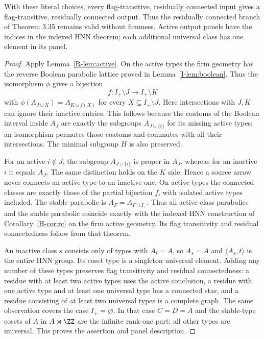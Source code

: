 \begin{theorem}\label{R-thm:rc}
With these literal choices, every flag-transitive, residually connected
input gives a flag-transitive, residually connected output. Thus the
residually connected branch of Theorem 3.35 remains valid without
firmness. Active output panels have the indices in the indexed HNN theorem; each additional universal class has one element
in its panel.
\end{theorem}
\begin{proof}
Apply Lemma~\ref{R-lem:active}. On the active types the firm geometry
has the reverse Boolean parabolic lattice proved in Lemma~\ref{I-lem:boolean}. Thus the isomorphism $\phi$ gives a
bijection
\[
 f:I_+\setminus J\longrightarrow I_+\setminus K
\]
with
$\phi(A_{J\cup X})=A_{K\cup f(X)}$ for every
$X\subseteq I_+\setminus J$. Here intersections with $J,K$
can ignore their inactive entries. This follows because the coatoms
of the Boolean interval inside $A_J$ are exactly the subgroups
$A_{J\cup\{i\}}$ for its missing active types; an isomorphism
permutes those coatoms and commutes with all their intersections.
The minimal subgroup $H$ is also preserved.

For an active $i\notin J$, the subgroup $A_{J\cup\{i\}}$ is
proper in $A_J$, whereas for an inactive $i$ it equals $A_J$.
The same distinction holds on the $K$ side. Hence a source arrow
never connects an active type to an inactive one. On active types
the connected classes are exactly those of the partial bijection
$f$, with isolated active types included. The stable parabolic is
$A_F=A_{F\cap I_+}$. Thus all active-class parabolics and the
stable parabolic coincide exactly with the indexed HNN
construction of Corollary~\ref{H-cor:rc} on the firm active geometry. Its flag transitivity and
residual connectedness follow from that theorem.

An inactive class $s$ consists only of types with $A_i=A$, so
$A_s=A$ and $\langle A_s,t\rangle$ is the entire HNN group.
Its coset type is a singleton universal element. Adding any number
of these types preserves flag transitivity and residual connectedness:
a residue with at least two active types uses the active conclusion,
a residue with one active type and at least one universal type has
a connected star, and a residue consisting of at least two universal
types is a complete graph. The same observation covers the case
$I_+=\varnothing$. In that case $C=D=A$ and the stable-type cosets
of $A$ in $A\rtimes\ZZ$ are the infinite rank-one part; all other
types are universal. This proves the assertion and panel description.
\end{proof}

